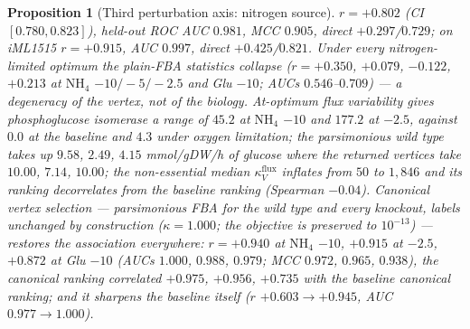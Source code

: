 \documentclass[11pt,a4paper]{article}
\theoremstyle{plain}
\newtheorem{proposition}[theorem]{Proposition}
\theoremstyle{definition}
\theoremstyle{remark}
\begin{document}
\begin{proposition}[Third perturbation axis: nitrogen source]
$r=+0.802$ (CI $[0.780,0.823]$), held-out ROC AUC $0.981$, MCC
$0.905$, direct $+0.297$/$0.729$; on iML1515 $r=+0.915$, AUC
$0.997$, direct $+0.425$/$0.821$. Under every nitrogen-limited
optimum the plain-FBA statistics collapse ($r=+0.350$, $+0.079$,
$-0.122$, $+0.213$ at $\mathrm{NH}_4$ $-10/-5/-2.5$ and Glu $-10$;
AUCs $0.546$--$0.709$) --- a degeneracy of the vertex, not of the
biology. At-optimum flux variability gives phosphoglucose isomerase
a range of $45.2$ at $\mathrm{NH}_4$ $-10$ and $177.2$ at $-2.5$,
against $0.0$ at the baseline and $4.3$ under oxygen limitation;
the parsimonious wild type takes up $9.58$, $2.49$, $4.15$
mmol/gDW/h of glucose where the returned vertices take $10.00$,
$7.14$, $10.00$; the non-essential median
$\kappa^{\mathrm{flux}}_V$ inflates from $50$ to $1{,}846$ and its
ranking decorrelates from the baseline ranking (Spearman $-0.04$).
Canonical vertex selection --- parsimonious FBA for the wild type
and every knockout, labels unchanged by construction
($\kappa=1.000$; the objective is preserved to $10^{-13}$) ---
restores the association everywhere: $r=+0.940$ at $\mathrm{NH}_4$
$-10$, $+0.915$ at $-2.5$, $+0.872$ at Glu $-10$ (AUCs $1.000$,
$0.988$, $0.979$; MCC $0.972$, $0.965$, $0.938$), the canonical
ranking correlated $+0.975$, $+0.956$, $+0.735$ with the baseline
canonical ranking; and it sharpens the baseline itself ($r$
$+0.603\to+0.945$, AUC $0.977\to1.000$).
\end{proposition}
\end{document}
